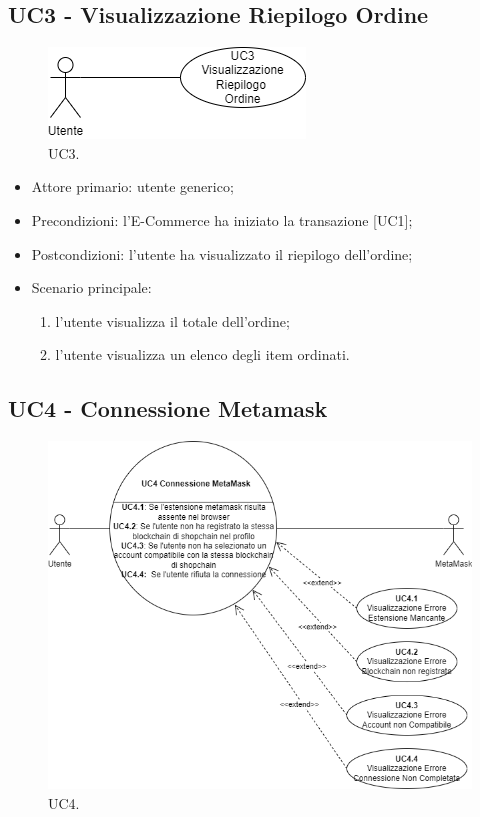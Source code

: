 \subsection{UC3 - Visualizzazione Riepilogo Ordine}

\begin{figure}[H]
    \centering
    \includegraphics[scale=0.7]{immagini/UseCases-UC3.png}
    \caption{UC3.}
  \end{figure}

\begin{itemize}
    \item Attore primario: utente generico;
    \item Precondizioni: l'E-Commerce ha iniziato la transazione [UC1];
    \item Postcondizioni: l'utente ha visualizzato il riepilogo dell'ordine;
    \item Scenario principale:
    \begin{enumerate}
        \item l'utente visualizza il totale dell'ordine;
        \item l'utente visualizza un elenco degli item ordinati.
    \end{enumerate}
\end{itemize}

\subsection{UC4 - Connessione Metamask}

\begin{figure}[H]
    \centering
    \includegraphics[scale=0.7]{immagini/UseCases-UC4.png}
    \caption{UC4.}
  \end{figure}

